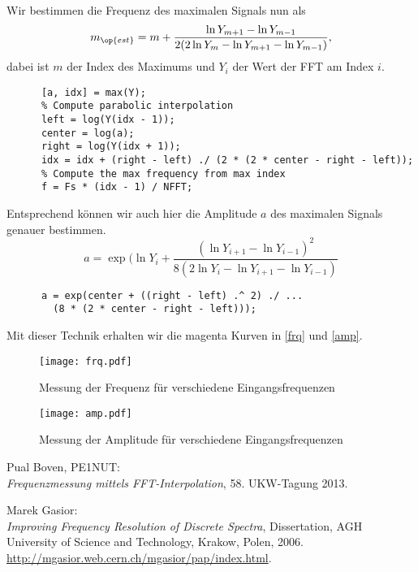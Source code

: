 \documentclass{exercise}
\begin{document}
    Wir bestimmen die Frequenz des maximalen Signals nun als
    \[ m_{\op{est}} = m + \frac{\ln Y_{m+1} - \ln Y_{m-1}}{2(2\ln Y_m - \ln Y_{m+1} - \ln Y_{m-1})}, \]
    dabei ist $m$ der Index des Maximums und $Y_i$ der Wert der FFT am Index $i$.
    \begin{lstlisting}[gobble=6]
      % Get the maximum in the spectrum
      [a, idx] = max(Y);
      % Compute parabolic interpolation
      left = log(Y(idx - 1));
      center = log(a);
      right = log(Y(idx + 1));
      idx = idx + (right - left) ./ (2 * (2 * center - right - left));
      % Compute the max frequency from max index
      f = Fs * (idx - 1) / NFFT;
    \end{lstlisting}

    Entsprechend können wir auch hier die Amplitude $a$ des maximalen Signals genauer bestimmen.
    \[ a = \exp(\ln Y_i + \frac{(\ln Y_{i+1} - \ln Y_{i-1})^2}{8(2\ln Y_i - \ln Y_{i+1} - \ln Y_{i-1})} \]
    \begin{lstlisting}[gobble=6]
      % Compute parabolic interpolation of amplitude
      a = exp(center + ((right - left) .^ 2) ./ ...
        (8 * (2 * center - right - left)));
    \end{lstlisting}

    Mit dieser Technik erhalten wir die magenta Kurven in \autoref{frq} und \autoref{amp}.

  \begin{figure}
    \texttt{[image: frq.pdf]} 
    \label{frq}
    \caption{Messung der Frequenz für verschiedene Eingangsfrequenzen}
  \end{figure}

  \begin{figure}
    \texttt{[image: amp.pdf]}
    \label{amp}
    \caption{Messung der Amplitude für verschiedene Eingangsfrequenzen}
  \end{figure}

  \begin{thebibliography}{22}
     Pual Boven, PE1NUT: \\
    \emph{Frequenzmessung mittels FFT-Interpolation}, 58. UKW-Tagung 2013.
  
     Marek Gasior: \\
    \emph{Improving Frequency Resolution of Discrete Spectra}, Dissertation, AGH University of Science and Technology, Krakow, Polen, 2006. \\
    \url{http://mgasior.web.cern.ch/mgasior/pap/index.html}.
  \end{thebibliography}
\end{document}
